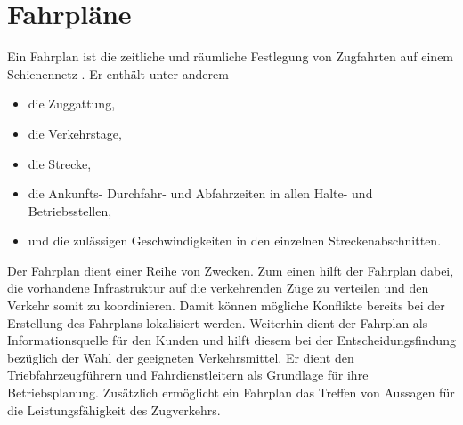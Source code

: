 \section{Fahrpläne}

Ein Fahrplan ist die zeitliche und räumliche Festlegung von Zugfahrten auf einem Schienennetz \cite{groger_simulation_2002}. Er enthält unter anderem
\begin{itemize}
    \item die Zuggattung,
    \item die Verkehrstage,
    \item die Strecke,
    \item die Ankunfts- Durchfahr- und Abfahrzeiten in allen Halte- und Betriebsstellen,
    \item und die zulässigen Geschwindigkeiten in den einzelnen Streckenabschnitten.
\end{itemize}
Der Fahrplan dient einer Reihe von Zwecken. Zum einen hilft der Fahrplan dabei, die vorhandene Infrastruktur auf die verkehrenden Züge zu verteilen und den Verkehr somit zu koordinieren. Damit können mögliche Konflikte bereits bei der Erstellung des Fahrplans lokalisiert werden. Weiterhin dient der Fahrplan als Informationsquelle für den Kunden und hilft diesem bei der Entscheidungsfindung bezüglich der Wahl der geeigneten Verkehrsmittel. Er dient den Triebfahrzeugführern und Fahrdienstleitern als Grundlage für ihre Betriebsplanung. Zusätzlich ermöglicht ein Fahrplan das Treffen von Aussagen für die Leistungsfähigkeit des Zugverkehrs. \cite{groger_simulation_2002}
